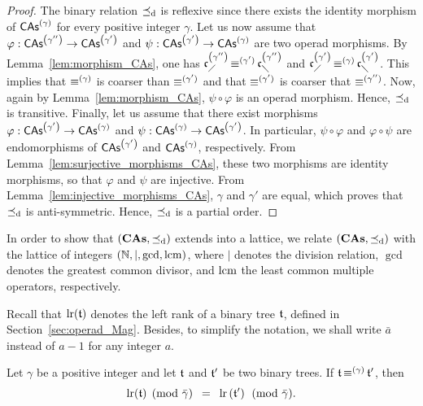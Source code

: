\begin{proof}
    The binary relation $\preceq_{\mathrm{d}}$ is reflexive since there exists the
    identity morphism of $\mathsf{CAs}^{\left(\gamma\right)}$ for every positive integer
    $\gamma$. Let us now assume that
    $\varphi:\mathsf{CAs}^{\left(\gamma''\right)} \to \mathsf{CAs}^{\left(\gamma'\right)}$ and
    $\psi:\mathsf{CAs}^{\left(\gamma'\right)} \to \mathsf{CAs}^{\left(\gamma\right)}$ are two operad morphisms. By
    Lemma~\ref{lem:morphism_CAs}, one has
    $\mathfrak{c}^{\left(\gamma''\right)}_{\diagup} \operatorname{\equiv}^{(\gamma')} \mathfrak{c}^{\left(\gamma''\right)}_{\diagdown}$ and
    $\mathfrak{c}^{\left(\gamma'\right)}_{\diagup} \operatorname{\equiv}^{(\gamma)} \mathfrak{c}^{\left(\gamma'\right)}_{\diagdown}$. This implies
    that $\operatorname{\equiv}^{(\gamma)}$ is coarser than $\operatorname{\equiv}^{(\gamma')}$ and
    that $\operatorname{\equiv}^{(\gamma')}$ is coarser that $\operatorname{\equiv}^{(\gamma'')}$. Now,
    again by Lemma~\ref{lem:morphism_CAs}, $\psi \circ \varphi$ is an
    operad morphism. Hence, $\preceq_{\mathrm{d}}$ is transitive. Finally, let us
    assume that there exist morphisms
    $\varphi:\mathsf{CAs}^{\left(\gamma'\right)}\to\mathsf{CAs}^{\left(\gamma\right)}$ and
    $\psi:\mathsf{CAs}^{\left(\gamma\right)}\to\mathsf{CAs}^{\left(\gamma'\right)}$. In particular,
    $\psi \circ \varphi$ and $\varphi \circ \psi$ are endomorphisms of
    $\mathsf{CAs}^{\left(\gamma'\right)}$ and $\mathsf{CAs}^{\left(\gamma\right)}$, respectively. From
    Lemma~\ref{lem:surjective_morphisms_CAs}, these two morphisms are
    identity morphisms, so that $\varphi$ and $\psi$ are injective. From
    Lemma~\ref{lem:injective_morphisms_CAs}, $\gamma$ and $\gamma'$ are
    equal, which proves that $\preceq_{\mathrm{d}}$ is anti-symmetric. Hence,
    $\preceq_{\mathrm{d}}$ is a partial order.
\end{proof}
\medbreak

In order to show that $\left(\mathbf{CAs}, \preceq_{\mathrm{d}}\right)$ extends into a
lattice, we relate $\left(\mathbf{CAs}, \preceq_{\mathrm{d}}\right)$ with the lattice of
integers $\left(\mathbb{N},\mid, \gcd, \operatorname{lcm}\right)$, where $\mid$ denotes the
division relation, $\gcd$ denotes the greatest common divisor, and
$\operatorname{lcm}$ the least common multiple operators, respectively.

Recall that
$\mathrm{lr}(\mathfrak{t})$ denotes the left rank of a binary tree $\mathfrak{t}$, defined in
Section~\ref{sec:operad_Mag}. Besides, to simplify the notation,
we shall write $\bar{a}$ instead of $a - 1$ for any integer $a$.
\medbreak

\begin{Lemma}\label{lem:left_rank_and_CongrCAs}
    Let $\gamma$ be a positive integer and let $\mathfrak{t}$ and
    $\mathfrak{t}'$ be two binary trees. If $\mathfrak{t} \operatorname{\equiv}^{(\gamma)} \mathfrak{t}'$, then
    \begin{equation}
        \mathrm{lr}(\mathfrak{t}) \pmod{\bar{\gamma}}
        \enspace = \enspace
        \mathrm{lr}\left(\mathfrak{t}'\right) \pmod{\bar{\gamma}}.
    \end{equation}
\end{Lemma}

